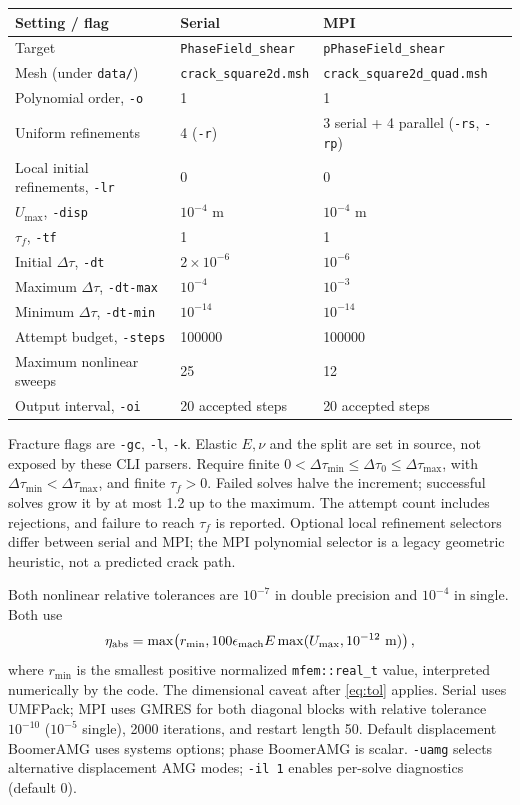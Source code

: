 \documentclass[11pt,a4paper]{article}
\newcommand{\code}[1]{\texttt{\small #1}}
\numberwithin{equation}{section}
\begin{document}
\begin{center}\small
\begin{tabular}{@{}p{.36\linewidth}p{.25\linewidth}p{.28\linewidth}@{}}
\toprule Setting / flag & Serial & MPI\\\midrule
Target & \code{PhaseField\_shear} & \code{pPhaseField\_shear}\\
Mesh (under \code{data/}) & \code{crack\_square2d.msh} & \code{crack\_square2d\_quad.msh}\\
Polynomial order, \code{-o} & 1 & 1\\
Uniform refinements & 4 (\code{-r}) & 3 serial + 4 parallel (\code{-rs}, \code{-rp})\\
Local initial refinements, \code{-lr} & 0 & 0\\
$U_{\max}$, \code{-disp} & $10^{-4}$ m & $10^{-4}$ m\\
$\tau_f$, \code{-tf} & 1 & 1\\
Initial $\Delta\tau$, \code{-dt} & $2\times10^{-6}$ & $10^{-6}$\\
Maximum $\Delta\tau$, \code{-dt-max} & $10^{-4}$ & $10^{-3}$\\
Minimum $\Delta\tau$, \code{-dt-min} & $10^{-14}$ & $10^{-14}$\\
Attempt budget, \code{-steps} & 100000 & 100000\\
Maximum nonlinear sweeps & 25 & 12\\
Output interval, \code{-oi} & 20 accepted steps & 20 accepted steps\\
\bottomrule
\end{tabular}\end{center}
Fracture flags are \code{-gc}, \code{-l}, \code{-k}. Elastic $E,\nu$ and
the split are set in source, not exposed by these CLI parsers. Require finite
$0<\Delta\tau_{\min}\le\Delta\tau_0\le\Delta\tau_{\max}$, with
$\Delta\tau_{\min}<\Delta\tau_{\max}$, and finite $\tau_f>0$.
Failed solves halve the increment; successful solves grow it by at most 1.2
up to the maximum. The attempt count includes rejections, and failure to reach
$\tau_f$ is reported. Optional local refinement selectors differ between
serial and MPI; the MPI polynomial selector is a legacy geometric heuristic,
not a predicted crack path.

Both nonlinear relative tolerances are $10^{-7}$ in double precision and
$10^{-4}$ in single. Both use
\begin{equation}
 \eta_{\rm abs}=\max\!\left(r_{\min},
       100\epsilon_{\rm mach}E\max(U_{\max},10^{-12}\text{ m})\right),
\end{equation}
where $r_{\min}$ is the smallest positive normalized \code{mfem::real\_t}
value, interpreted numerically by the code. The dimensional caveat after
\eqref{eq:tol} applies. Serial uses UMFPack; MPI uses GMRES for both diagonal
blocks with relative tolerance $10^{-10}$ ($10^{-5}$ single), 2000 iterations,
and restart length 50. Default displacement BoomerAMG uses systems options;
phase BoomerAMG is scalar. \code{-uamg} selects alternative displacement AMG
modes; \code{-il 1} enables per-solve diagnostics (default 0).
\end{document}

